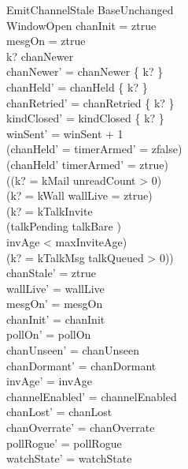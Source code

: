 \documentclass[a4paper,10pt,fleqn]{article}
\begin{document}
\begin{schema}{EmitChannelStale}
  BaseUnchanged \\
  WindowOpen
  \where
  chanInit = ztrue \\
  mesgOn = ztrue \\
  k? \in chanNewer \\
  chanNewer' = chanNewer \setminus \{ k? \} \\
  chanHeld' = chanHeld \setminus \{ k? \} \\
  chanRetried' = chanRetried \setminus \{ k? \} \\
  kindClosed' = kindClosed \cup \{ k? \} \\
  winSent' = winSent + 1 \\
  (chanHeld' = \emptyset \implies timerArmed' = zfalse) \\
  (chanHeld' \neq \emptyset \implies timerArmed' = ztrue) \\
  \lnot ((k? = kMail \land unreadCount > 0) \lor \\
  (k? = kWall \land wallLive = ztrue) \lor \\
  (k? = kTalkInvite \land \\
  \quad (\dom talkPending \neq \emptyset \lor talkBare \neq \emptyset) \land \\
  \quad invAge < maxInviteAge) \lor \\
  (k? = kTalkMsg \land talkQueued > 0)) \\
  chanStale' = ztrue \\
  wallLive' = wallLive \\
  mesgOn' = mesgOn \\
  chanInit' = chanInit \\
  pollOn' = pollOn \\
  chanUnseen' = chanUnseen \\
  chanDormant' = chanDormant \\
  invAge' = invAge \\
  channelEnabled' = channelEnabled \\
  chanLost' = chanLost \\
  chanOverrate' = chanOverrate \\
  pollRogue' = pollRogue \\
  watchState' = watchState
\end{schema}
\end{document}
